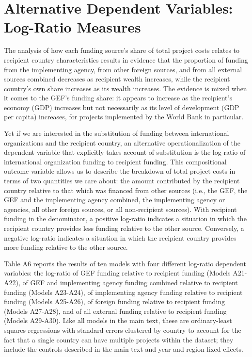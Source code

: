 \documentclass{article}
\begin{document}
\section{Alternative Dependent Variables: Log-Ratio Measures}
The analysis of how each funding source’s share of total project costs relates to recipient country characteristics results in evidence that the proportion of funding from the implementing agency, from other foreign sources, and from all external sources combined decreases as recipient wealth increases, while the recipient country’s own share increases as its wealth increases.  The evidence is mixed when it comes to the GEF’s funding share: it appears to increase as the recipient’s economy (GDP) increases but not necessarily as its level of development (GDP per capita) increases, for projects implemented by the World Bank in particular.
  
Yet if we are interested in the substitution of funding between international organizations and the recipient country, an alternative operationalization of the dependent variable that explicitly takes account of substitution is the log-ratio of international organization funding to recipient funding.  This compositional outcome variable allows us to describe the breakdown of total project costs in terms of two quantities we care about: the amount contributed by the recipient country relative to that which was financed from other sources (i.e., the GEF, the GEF and the implementing agency combined, the implementing agency or agencies, all other foreign sources, or all non-recipient sources).  With recipient funding in the denominator, a positive log-ratio indicates a situation in which the recipient country provides less funding relative to the other source.  Conversely, a negative log-ratio indicates a situation in which the recipient country provides more funding relative to the other source.   									

Table A6 reports the results of ten models with four different log-ratio dependent variables: the log-ratio of GEF funding relative to recipient funding (Models A21-A22), of GEF and implementing agency funding combined relative to recipient funding (Models A23-A24), of implementing agency funding relative to recipient funding (Models A25-A26), of foreign funding relative to recipient funding (Models A27-A28), and of all external funding relative to recipient funding (Models A29-A30).  Like all models in the main text, these are ordinary-least squares regressions with standard errors clustered by country to account for the fact that a single country can have multiple projects within the dataset; they include the controls described in the main text and year and region fixed effects.
\end{document}
